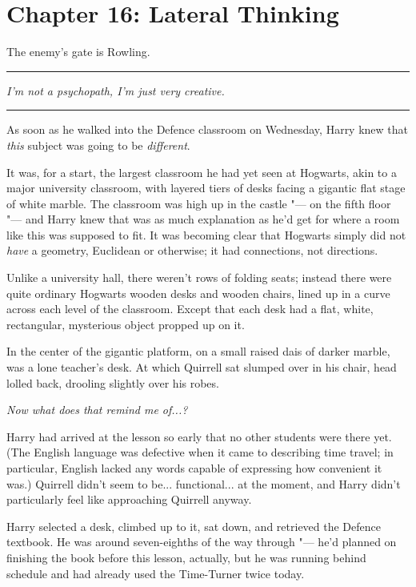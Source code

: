 \chapter{Chapter 16: Lateral Thinking}
The enemy's gate is Rowling.

\begin{center}\rule{3in}{0.4pt}\end{center}

\emph{I'm not a psychopath, I'm just very creative.}

\begin{center}\rule{3in}{0.4pt}\end{center}

As soon as he walked into the Defence classroom on Wednesday, Harry knew
that \emph{this} subject was going to be \emph{different}.

It was, for a start, the largest classroom he had yet seen at Hogwarts,
akin to a major university classroom, with layered tiers of desks facing
a gigantic flat stage of white marble. The classroom was high up in the
castle "--- on the fifth floor "--- and Harry knew that was as much
explanation as he'd get for where a room like this was supposed to fit.
It was becoming clear that Hogwarts simply did not \emph{have} a
geometry, Euclidean or otherwise; it had connections, not directions.

Unlike a university hall, there weren't rows of folding seats; instead
there were quite ordinary Hogwarts wooden desks and wooden chairs, lined
up in a curve across each level of the classroom. Except that each desk
had a flat, white, rectangular, mysterious object propped up on it.

In the center of the gigantic platform, on a small raised dais of darker
marble, was a lone teacher's desk. At which Quirrell sat slumped over in
his chair, head lolled back, drooling slightly over his robes.

\emph{Now what does that remind me of...?}

Harry had arrived at the lesson so early that no other students were
there yet. (The English language was defective when it came to
describing time travel; in particular, English lacked any words capable
of expressing how convenient it was.) Quirrell didn't seem to be...
functional... at the moment, and Harry didn't particularly feel
like approaching Quirrell anyway.

Harry selected a desk, climbed up to it, sat down, and retrieved the
Defence textbook. He was around seven-eighths of the way through "--- he'd
planned on finishing the book before this lesson, actually, but he was
running behind schedule and had already used the Time-Turner twice
today.

